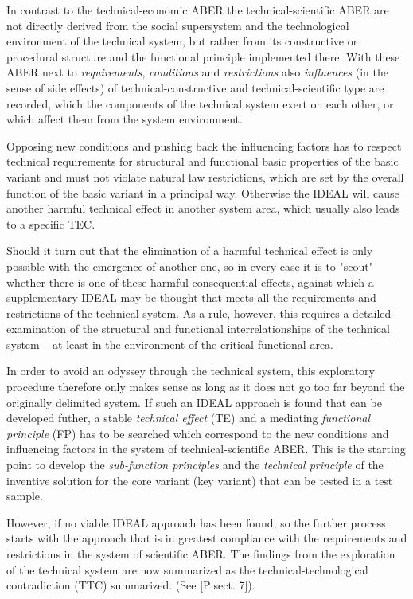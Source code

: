 \documentclass[11pt,a4paper]{article}
\begin{document}
In contrast to the technical-economic ABER the technical-scientific ABER are
not directly derived from the social supersystem and the technological
environment of the technical system, but rather from its constructive or
procedural structure and the functional principle implemented there.  With
these ABER next to \emph{requirements}, \emph{conditions} and
\emph{restrictions} also \emph{influences} (in the sense of side effects) of
technical-constructive and technical-scientific type are recorded, which the
components of the technical system exert on each other, or which affect them
from the system environment.

Opposing new conditions and pushing back the influencing factors has to
respect technical requirements for structural and functional basic properties
of the basic variant and must not violate natural law restrictions, which are
set by the overall function of the basic variant in a principal way. Otherwise
the IDEAL will cause another harmful technical effect in another system area,
which usually also leads to a specific TEC.

Should it turn out that the elimination of a harmful technical effect is only
possible with the emergence of another one, so in every case it is to "scout"
whether there is one of these harmful consequential effects, against which a
supplementary IDEAL may be thought that meets all the requirements and
restrictions of the technical system.  As a rule, however, this requires a
detailed examination of the structural and functional interrelationships of
the technical system -- at least in the environment of the critical functional
area.

In order to avoid an odyssey through the technical system, this exploratory
procedure therefore only makes sense as long as it does not go too far beyond
the originally delimited system.  If such an IDEAL approach is found that can
be developed futher, a stable \emph{technical effect} (TE) and a mediating
\emph{functional principle} (FP) has to be searched which correspond to the
new conditions and influencing factors in the system of technical-scientific
ABER.  This is the starting point to develop the \emph{sub-function
  principles} and the \emph{technical principle} of the inventive solution for
the core variant (key variant) that can be tested in a test sample.

However, if no viable IDEAL approach has been found, so the further process
starts with the approach that is in greatest compliance with the requirements
and restrictions in the system of scientific ABER. The findings from the
exploration of the technical system are now summarized as the
technical-technological contradiction (TTC) summarized. (See [P:sect. 7]).
\end{document}
